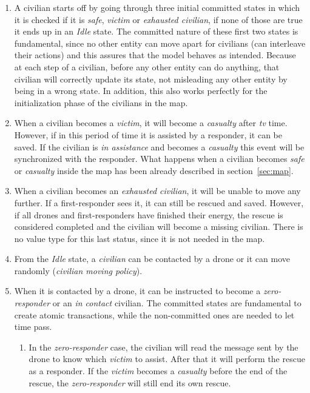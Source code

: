 \begin{enumerate}
	\item A civilian starts off by going through three initial committed states in which it is checked if it is \textit{safe}, \textit{victim} or \textit{exhausted civilian}, if none of those are true it ends up in an \textit{Idle} state. The committed nature of these first two states is fundamental, since no other entity can move apart for civilians (can interleave their actions) and this assures that the model behaves as intended. Because at each step of a civilian, before any other entity can do anything, that civilian will correctly update its state, not misleading any other entity by being in a wrong state. In addition, this also works perfectly for the initialization phase of the civilians in the map.
	
	\item When a civilian becomes a \textit{victim}, it will become a \textit{casualty} after \textit{tv} time. However, if in this period of time it is assisted by a responder, it can be saved. If the civilian is \textit{in assistance} and becomes a \textit{casualty} this event will be synchronized with the responder.\newline
	What happens when a civilian becomes \textit{safe} or \textit{casualty} inside the map has been already described in section~\ref{sec:map}.
	
	\item When a civilian becomes an \textit{exhausted civilian}, it will be unable to move any further. If a first-responder sees it, it can still be rescued and saved. However, if all drones and first-responders have finished their energy, the rescue is considered completed and the civilian will become a missing civilian. There is no value type for this last status, since it is not needed in the map.
	
	\item From the \textit{Idle} state, a \textit{civilian} can be contacted by a drone or it can move randomly (\textit{civilian moving policy}).
	
	\item When it is contacted by a drone, it can be instructed to become a \textit{zero-responder} or an \textit{in contact} civilian. The committed states are fundamental to create atomic transactions, while the non-committed ones are needed to let time pass.
	
	\begin{enumerate}
		\item In the \textit{zero-responder} case, the civilian will read the message sent by the drone to know which \textit{victim} to assist. After that it will perform the rescue as a responder. If the \textit{victim} becomes a \textit{casualty} before the end of the rescue, the \textit{zero-responder} will still end its own rescue.
		

\end{enumerate}
\end{enumerate}
